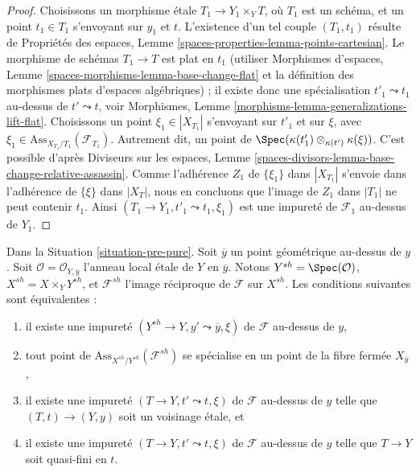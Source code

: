 \begin{proof}
Choisissons un morphisme \'etale $T_1 \to Y_1 \times_Y T$, où $T_1$
est un schéma, et un point $t_1 \in T_1$ s'envoyant sur $y_1$ et $t$.
L'existence d'un tel couple $(T_1, t_1)$ résulte de
Propriétés des espaces, Lemme \ref{spaces-properties-lemma-points-cartesian}.
Le morphisme de schémas $T_1 \to T$ est plat en $t_1$
(utiliser Morphismes d'espaces, Lemme \ref{spaces-morphisms-lemma-base-change-flat}
et la définition des morphismes plats d'espaces algébriques) ;
il existe donc une spécialisation $t'_1 \leadsto t_1$ au-dessus de
$t' \leadsto t$, voir
Morphismes, Lemme \ref{morphisms-lemma-generalizations-lift-flat}.
Choisissons un point $\xi_1 \in |X_{T_1}|$ s'envoyant sur $t'_1$
et sur $\xi$, avec $\xi_1 \in \text{Ass}_{X_{T_1}/T_1}(\mathcal{F}_{T_1})$.
Autrement dit, un point de $\Spec(\kappa(t'_1) \otimes_{\kappa(t')} \kappa(\xi))$.
C'est possible d'après
Diviseurs sur les espaces, Lemme
\ref{spaces-divisors-lemma-base-change-relative-assassin}.
Comme l'adhérence $Z_1$ de $\{\xi_1\}$ dans $|X_{T_1}|$ s'envoie dans
l'adhérence de $\{\xi\}$ dans $|X_T|$, nous en concluons que
l'image de $Z_1$ dans $|T_1|$ ne peut contenir $t_1$.
Ainsi $(T_1 \to Y_1, t'_1 \leadsto t_1, \xi_1)$
est une impureté de $\mathcal{F}_1$ au-dessus de $Y_1$.
\end{proof}

\begin{lemma}
\label{lemma-pure-along-X-y}
Dans la Situation \ref{situation-pre-pure}. Soit $\overline{y}$ un point
géométrique au-dessus de $y$. Soit $\mathcal{O} = \mathcal{O}_{Y, \overline{y}}$
l'anneau local étale de $Y$ en $\overline{y}$. Notons
$Y^{sh} = \Spec(\mathcal{O})$, $X^{sh} = X \times_Y Y^{sh}$, et
$\mathcal{F}^{sh}$ l'image réciproque de $\mathcal{F}$ sur $X^{sh}$.
Les conditions suivantes sont équivalentes :
\begin{enumerate}
\item il existe une impureté
$(Y^{sh} \to Y, y' \leadsto \overline{y}, \xi)$
de $\mathcal{F}$ au-dessus de $y$,
\item tout point de $\text{Ass}_{X^{sh}/Y^{sh}}(\mathcal{F}^{sh})$
se spécialise en un point de la fibre fermée $X_{\overline{y}}$,
\item il existe une impureté $(T \to Y, t' \leadsto t, \xi)$
de $\mathcal{F}$ au-dessus de $y$ telle que $(T, t) \to (Y, y)$ soit un
voisinage \'etale, et
\item il existe une impureté $(T \to Y, t' \leadsto t, \xi)$
de $\mathcal{F}$ au-dessus de $y$ telle que $T \to Y$ soit quasi-fini en $t$.
\end{enumerate}
\end{lemma}

